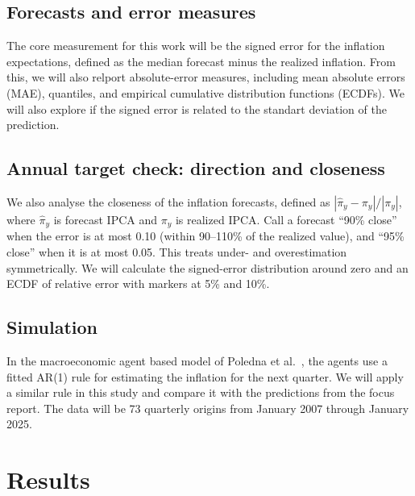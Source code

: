 \documentclass[11pt,a4paper]{article}
\begin{document}
\subsection{Forecasts and error measures}
The core measurement for this work will be the signed error for the inflation expectations, defined as the median forecast minus the realized inflation. From this, we will also relport absolute-error measures, including mean absolute errors (MAE), quantiles, and empirical cumulative distribution functions (ECDFs). We will also explore if the signed error is related to the standart deviation of the prediction. 

\subsection{Annual target check: direction and closeness}
We also analyse the closeness of the inflation forecasts, defined as $|\hat{\pi}_y-\pi_y|/|\pi_y|$, where $\hat{\pi}_y$ is forecast IPCA and $\pi_y$ is realized IPCA. Call a forecast ``90\% close'' when the error is at most 0.10 (within 90--110\% of the realized value), and ``95\% close'' when it is at most 0.05. This treats under- and overestimation symmetrically. We will calculate the signed-error distribution around zero and an ECDF of relative error with markers at 5\% and 10\%.


\subsection{Simulation}
In the macroeconomic agent based model of Poledna et al.~\cite{poledna2023}, the agents use a fitted AR(1) rule for estimating the inflation for the next quarter. We will apply a similar rule in this study and compare it with the predictions from the focus report. The data will be 73 quarterly origins from January 2007 through January 2025.

\section{Results}
\end{document}
